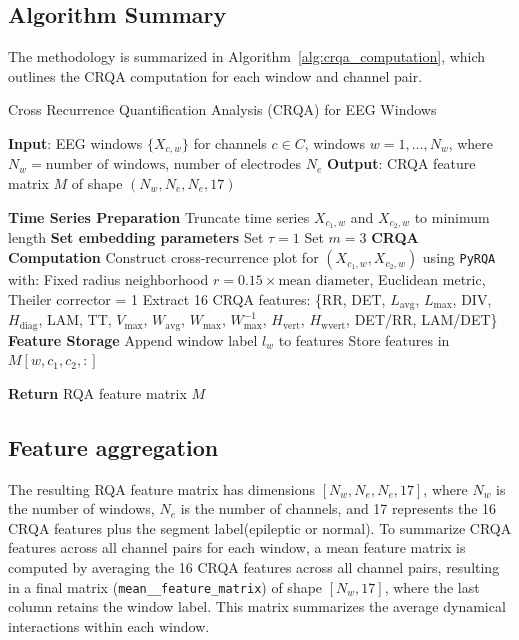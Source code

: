 \documentclass{article}
\begin{document}
				\subsection{Algorithm Summary}
				\label{subsec:algorithm}

				The methodology is summarized in Algorithm~\ref{alg:crqa_computation}, which outlines the CRQA computation for each window and channel pair.

				\begin{algorithm}
				\caption{Cross Recurrence Quantification Analysis (CRQA) for EEG Windows}
				\label{alg:crqa_computation}
				\begin{algorithmic}[1]
				\State \textbf{Input}: EEG windows \( \{X_{c,w}\} \) for channels \( c \in C \), windows \( w = 1, \dots, N_w \), where \( N_w = \text{number of windows} \), number of electrodes \( N_e \)
				\State \textbf{Output}: CRQA feature matrix \( M \) of shape \( (N_w, N_e, N_e, 17) \)

					\State \textbf{Time Series Preparation}
					\State Truncate time series \( X_{c_1,w} \) and \( X_{c_2,w} \) to minimum length
					\State \textbf{Set embedding parameters}
					\State Set \( \tau = 1 \)
					\State Set \( m = 3 \)
					\State \textbf{CRQA Computation}
					\State Construct cross-recurrence plot for \( (X_{c_1,w}, X_{c_2,w}) \) using \texttt{PyRQA} with:
					\State \quad Fixed radius neighborhood \( r = 0.15 \times \text{mean diameter} \), Euclidean metric, Theiler corrector = 1
					\State Extract 16 CRQA features: \{RR, DET, \( L_{\text{avg}} \), \( L_{\text{max}} \), DIV, \( H_{\text{diag}} \), LAM, TT, \( V_{\text{max}} \), \( W_{\text{avg}} \), \( W_{\text{max}} \), \( W_{\text{max}}^{-1} \), \( H_{\text{vert}} \), \( H_{\text{wvert}} \), DET/RR, LAM/DET\}
					\State \textbf{Feature Storage}
					\State Append window label \( l_w \) to features
					\State Store features in \( M[w, c_1, c_2, :] \)
				    \EndFor
				\EndFor

				\State \textbf{Return} RQA feature matrix \( M \)
				\end{algorithmic}
				\end{algorithm}

				 \subsection{Feature aggregation}
				 \label{subsec:feature_aggregation}
				 The resulting RQA feature matrix has dimensions \([N_w, N_e, N_e, 17]\), where \(N_w\) is the number of windows, 
				\(N_e\) is the number of channels, and 17 represents the 16 CRQA features plus the segment label(epileptic or normal). 
				 To summarize CRQA features across all channel pairs for each window, 
				 a mean feature matrix is computed by averaging the 16 CRQA features across all channel pairs, 
				 resulting in a final matrix (\texttt{mean\_\_feature\_matrix}) of shape \([N_w, 17]\), where the last column retains the window label. 
				 This matrix summarizes the average dynamical interactions within each window.
\end{document}
